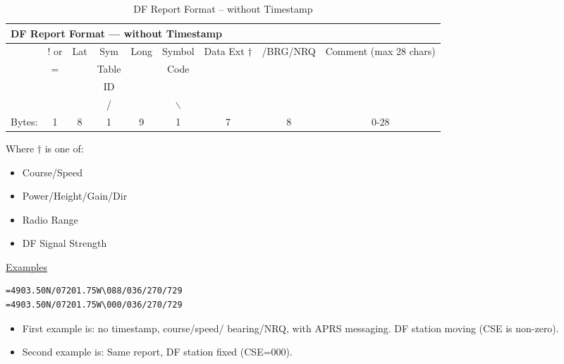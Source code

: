 \begin{table}[H]
  
  \begin{tabular}{r|c|c|c|c|c|c|c|c|}
    \hline
    \multicolumn{9}{l}{DF Report Format — without Timestamp} \\
    \hline 
    & ! or & Lat & Sym    & Long & Symbol & Data Ext $\dagger$ & /BRG/NRQ  & Comment (max 28 chars) \\
    & =    &     & Table  &      & Code   &       &   & \\
    &      &     & ID     &      &        &       &   & \\
    &      &     &  /     &      &   $\backslash$    &       &   & \\
    \hline
    Bytes: & 1 & 8 & 1 & 9 & 1 & 7 & 8 & 0-28  \\
    \hline
        
  \end{tabular}
  \vspace{2em}
  
  Where $\dagger$ is one of:
  \begin{itemize}
  \item Course/Speed
  \item Power/Height/Gain/Dir
  \item Radio Range
  \item DF Signal Strength
  \end{itemize}

  \vspace {2em}
  
  \underline{Examples}
  \vspace{1em}
  
\begin{verbatim}
=4903.50N/07201.75W\088/036/270/729
=4903.50N/07201.75W\000/036/270/729
\end{verbatim}
\vspace{2em}

\begin{itemize}
\item First example is: no timestamp, course/speed/
bearing/NRQ, with APRS messaging.
DF station moving (CSE is non-zero).

\item Second example is: Same report, DF station fixed
(CSE=000).
\end{itemize}

  \doublerule
  \caption{DF Report Format -- without Timestamp}
\end{table}




